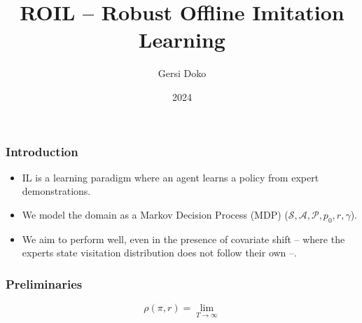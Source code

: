 \documentclass{beamer}
\title{ROIL -- Robust Offline Imitation Learning}
\author{Gersi Doko}
\institute{Dept. of Computer Science, University of New Hampshire}
\date{2024}
\begin{document}
\frame{\titlepage}

\begin{frame}
\frametitle{Introduction}
	\begin{itemize}
		\item IL is a learning paradigm where an agent learns a policy from expert demonstrations.
		\item We model the domain as a Markov Decision Process (MDP) ($\mathcal{S}, \mathcal{A}, \mathcal{P}, p_0, r, \gamma$).
		\item We aim to perform well, even in the presence of covariate shift -- where the experts state visitation distribution does not follow their own --.
	\end{itemize}
\end{frame}

\begin{frame}
	\frametitle{Preliminaries}
	\[\rho(\pi, r) = \lim_{T \to \infty} \]
\end{frame}
\end{document}
